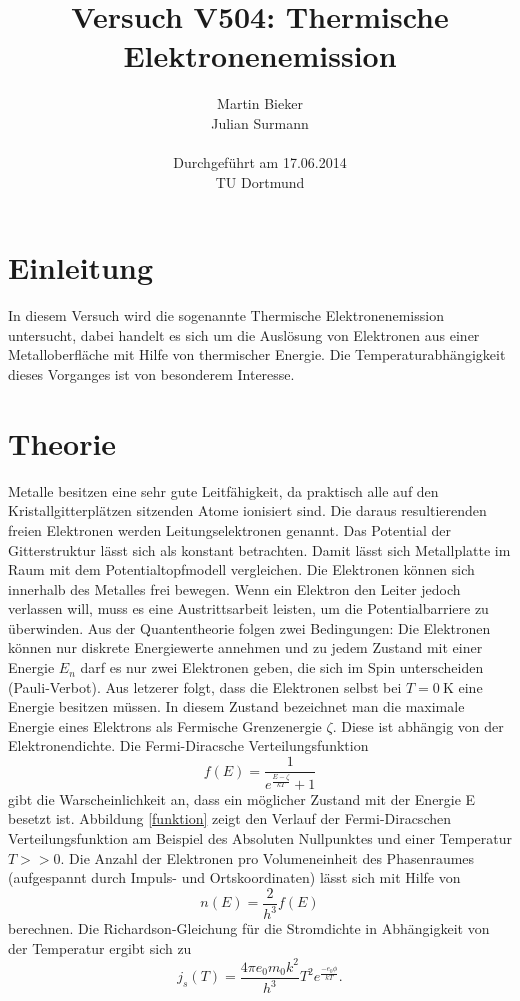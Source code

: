 \documentclass[11pt,ngerman,a4paper]{article}
\title{\textbf{Versuch V504: Thermische Elektronenemission}}
\author{Martin Bieker\\
		Julian Surmann\\
		\\
		Durchgef\"{u}hrt am 17.06.2014\\
		TU Dortmund}
\date{}
\begin{document}
\renewcommand\tablename{Tabelle}
\renewcommand\figurename{Abbildung}
\maketitle
\thispagestyle{empty}
\newpage
\clearpage
\setcounter{page}{1}


\section{Einleitung}
In diesem Versuch wird die sogenannte Thermische Elektronenemission untersucht, dabei handelt es sich um die Auslösung von Elektronen aus einer Metalloberfläche mit Hilfe von thermischer Energie. Die Temperaturabhängigkeit dieses Vorganges ist von besonderem Interesse.
\section{Theorie}
Metalle besitzen eine sehr gute Leitfähigkeit, da praktisch alle auf den Kristallgitterplätzen sitzenden Atome ionisiert sind. Die daraus resultierenden freien Elektronen werden Leitungselektronen genannt. Das Potential der Gitterstruktur lässt sich als konstant betrachten. Damit lässt sich Metallplatte im Raum mit dem Potentialtopfmodell vergleichen. Die Elektronen können sich innerhalb des Metalles frei bewegen. Wenn ein Elektron den Leiter jedoch verlassen will, muss es eine Austrittsarbeit leisten, um die Potentialbarriere zu überwinden. Aus der Quantentheorie  folgen zwei Bedingungen: Die Elektronen können nur diskrete Energiewerte annehmen und zu jedem Zustand mit einer Energie $E_n$ darf es nur zwei Elektronen geben, die sich im Spin unterscheiden (Pauli-Verbot). Aus letzerer folgt, dass die Elektronen selbst bei $T = \SI{0}{\kelvin}$ eine Energie besitzen müssen. In diesem Zustand bezeichnet man die maximale Energie eines Elektrons als Fermische Grenzenergie $\zeta$. Diese ist abhängig von der Elektronendichte. Die Fermi-Diracsche Verteilungsfunktion
\begin{equation}
f(E) = \frac{1}{e^{\frac{E-\zeta}{k T}}+1}
\end{equation}
gibt die Warscheinlichkeit an, dass ein möglicher Zustand mit der Energie E besetzt ist.
Abbildung \ref{funktion} zeigt den Verlauf der Fermi-Diracschen Verteilungsfunktion am Beispiel des Absoluten Nullpunktes und einer Temperatur $T >> 0$.
\newline
Die Anzahl der Elektronen pro Volumeneinheit des Phasenraumes (aufgespannt durch Impuls- und Ortskoordinaten) lässt sich mit Hilfe von
\begin{equation}
n(E) = \frac{2}{h^3}f(E)
\end{equation}
berechnen. Die Richardson-Gleichung für die Stromdichte in Abhängigkeit von der Temperatur ergibt sich zu
\begin{equation}
j_s(T) = \frac{4\pi e_0 m_0 k^2}{h^3} T^2 e^{\frac{-e_0 \phi}{k T}}.
\end{equation}
\end{document}
